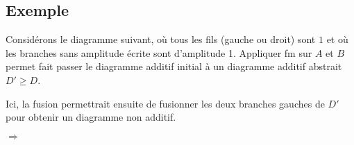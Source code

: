 
\begin{multicols}{2}
  \section{Exemple}
  Considérons le diagramme suivant, où tous les fils (gauche ou droit) sont $\boxed 1$ et où les branches sans amplitude écrite sont d'amplitude 1. Appliquer fm sur $A$ et $B$ permet fait passer le diagramme additif initial à un diagramme additif abstrait $D' \ge D$.

  Ici, la fusion permettrait ensuite de fusionner les deux branches gauches de $D'$ pour obtenir un diagramme non additif.

  \columnbreak
  $\Rightarrow$

  \end{multicols}
